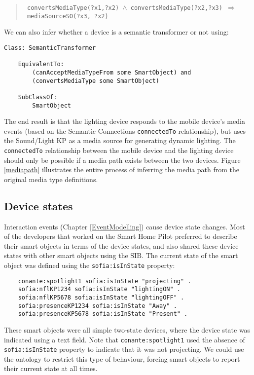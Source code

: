 \begin{quote}
\texttt{\scriptsize
convertsMediaType(?x1,?x2)~\ensuremath{\wedge}~convertsMediaType(?x2,?x3)~\ensuremath{\Rightarrow}~mediaSourceSO(?x3, ?x2)}
\end{quote}


\noindent We can also infer whether a device is a semantic transformer or not using:


\begin{verbatim}
Class: SemanticTransformer

    EquivalentTo:
        (canAcceptMediaTypeFrom some SmartObject) and
        (convertsMediaType some SmartObject)

    SubClassOf:
        SmartObject
\end{verbatim}


The end result is that the lighting device responds to the mobile device's media events (based on the Semantic Connections \texttt{connectedTo} relationship), but uses the Sound/Light KP as a media source for generating dynamic lighting. The \texttt{connectedTo} relationship between the mobile device and the lighting device should only be possible if a media path exists between the two devices. Figure \ref{mediapath} illustrates the entire process of inferring the media path from the original media type definitions.

\subsection{Device states}

Interaction events (Chapter \ref{EventModelling}) cause device state changes. Most of the developers that worked on the Smart Home Pilot preferred to describe their smart objects in terms of the device states, and also shared these device states with other smart objects using the SIB. The current state of the smart object was defined using the \texttt{sofia:isInState} property:

\begin{verbatim}
	conante:spotlight1 sofia:isInState "projecting" .
	sofia:nflKP1234 sofia:isInState "lightingON" .
	sofia:nflKP5678 sofia:isInState "lightingOFF" .
	sofia:presenceKP1234 sofia:isInState "Away" .
	sofia:presenceKP5678 sofia:isInState "Present" .
\end{verbatim}

These smart objects were all simple two-state devices, where the device state was indicated using a text field. Note that \texttt{conante:spotlight1} used the absence of \texttt{sofia:isInState} property to indicate that it was not projecting. We could use the ontology to restrict this type of behaviour, forcing smart objects to report their current state at all times.


